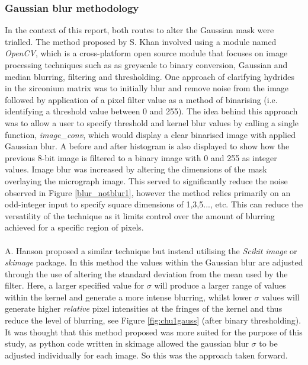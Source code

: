 \documentclass{article}
\begin{document}
	\subsubsection{Gaussian blur methodology}
	In the context of this report, both routes to alter the Gaussian mask were trialled. The method proposed by S. Khan involved using a module named \textit{OpenCV}, which is a cross-platform open source module that focuses on image processing techniques such as as greyscale to binary conversion, Gaussian and median blurring, filtering and thresholding. One approach of clarifying hydrides in the zirconium matrix was to initially blur and remove noise from the image followed by application of a pixel filter value as a method of binarising (i.e. identifying a threshold value between 0 and 255). The idea behind this approach was to allow a user to specify threshold and kernel blur values by calling a single function, \textit{image\_conv}, which would display a clear binarised image with applied Gaussian blur. A before and after histogram is also displayed to show how the previous 8-bit image is filtered to a binary image with 0 and 255 as integer values. Image blur was increased by altering the dimensions of the mask overlaying the micrograph image. This served to significantly reduce the noise observed in Figure \ref{blur_notblur1}, however the method relies primarily on an odd-integer input to specify square dimensions of 1,3,5..., etc. This can reduce the versatility of the technique as it limits control over the amount of blurring achieved for a specific region of pixels. 
	\\
	\\
	A. Hanson proposed a similar technique but instead utilising the \textit{Scikit image} or \textit{skimage} package. In this method the values within the Gaussian blur are adjusted through the use of altering the standard deviation from the mean used by the filter. Here, a larger specified value for $\sigma$ will produce a larger range of values within the kernel and generate a more intense blurring, whilst lower $\sigma$ values will generate higher \textit{relative} pixel intensities at the fringes of the kernel and thus reduce the level of blurring, see Figure \ref{fig:chu1gauss} (after binary thresholding). It was thought that this method proposed was more suited for the purpose of this study, as python code written in skimage allowed the gaussian blur $\sigma$ to be adjusted individually for each image. So this was the approach taken forward.
	\\
	\\
\end{document}
